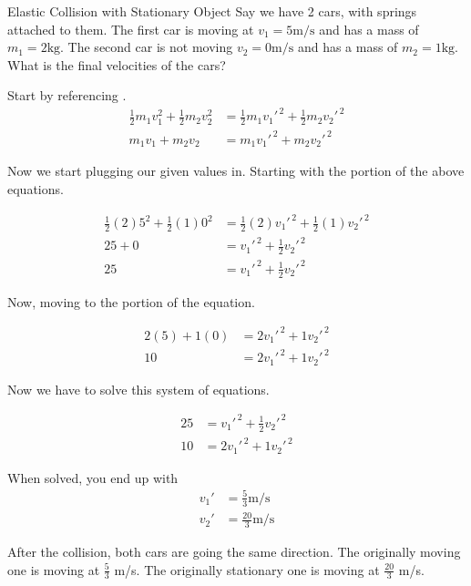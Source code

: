 \begin{example}[]{Elastic Collision with Stationary Object}
  Say we have 2 cars, with springs attached to them.
  The first car is moving at $v_{1} = 5 \si{\meter / \second}$ and has a mass of $m_{1} = 2 \si{\kilo \gram}$.
  The second car is not moving $v_{2} = 0 \si{\meter / \second}$ and has a mass of $m_{2} = 1 \si{\kilo \gram}$.
  What is the final velocities of the cars?

  \tcblower

  Start by referencing .
  \begin{align*}
    \frac{1}{2} m_{1} v_{1}^{2} + \frac{1}{2} m_{2} v_{2}^{2} &= \frac{1}{2} m_{1} v_{1}'^{\,2} + \frac{1}{2} m_{2} v_{2}'^{\,2} \\
    m_{1} v_{1} + m_{2} v_{2} &= m_{1} v_{1}'^{\,2} + m_{2} v_{2}'^{\,2}
  \end{align*}

  Now we start plugging our given values in.
  Starting with the  portion of the above equations.

  \begin{align*}
    \frac{1}{2} (2) 5^{2} + \frac{1}{2} (1) 0^{2} &= \frac{1}{2} (2) v_{1}'^{\,2} + \frac{1}{2} (1) v_{2}'^{\,2} \\
    25 + 0 &= v_{1}'^{\,2} + \frac{1}{2} v_{2}'^{\,2} \\
    25 &= v_{1}'^{\,2} + \frac{1}{2} v_{2}'^{\,2}
  \end{align*}

  Now, moving to the  portion of the equation.

  \begin{align*}
    2 (5) + 1 (0) &= 2 v_{1}'^{\,2} + 1 v_{2}'^{\,2} \\
    10 &= 2 v_{1}'^{\,2} + 1 v_{2}'^{\,2}
  \end{align*}

  Now we have to solve this system of equations.

  \begin{align*}
    25 &= v_{1}'^{\,2} + \frac{1}{2} v_{2}'^{\,2} \\
    10 &= 2 v_{1}'^{\,2} + 1 v_{2}'^{\,2}
  \end{align*}

  When solved, you end up with
  \begin{align*}
    v_{1}' &= \frac{5}{3} \si{\meter / \second} \\
    v_{2}' &= \frac{20}{3} \si{\meter / \second}
  \end{align*}

  After the collision, both cars are going the same direction.
  The originally moving one is moving at $\frac{5}{3}$ \si{\meter / \second}.
  The originally stationary one is moving at $\frac{20}{3}$ \si{\meter / \second}.
\end{example}

